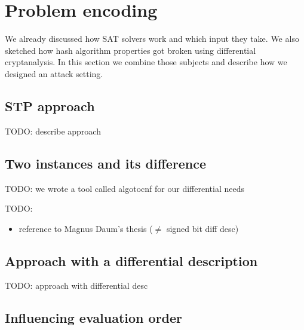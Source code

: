 \renewcommand*\chappic{img/encoding.pdf}
\renewcommand*\chapquote{There is concensus that encoding techniques usually have a dramatic impact on the efficiency of the SAT solver}
\renewcommand*\chapquotesrc{Magnus Bj\"ork}
\chapter{Problem encoding}
\label{ch:enc}

We already discussed how SAT solvers work and which input they take.
We also sketched how hash algorithm properties got broken using
differential cryptanalysis. In this section we combine those
subjects and describe how we designed an attack setting.

\section{STP approach}
\label{sec:enc-stp}


TODO: describe approach

\section{Two instances and its difference}
\label{sec:enc-algotocnf}

TODO: we wrote a tool called algotocnf for our differential needs


TODO:
\begin{itemize}
  \item reference to Magnus Daum's thesis ($\neq$ signed bit diff desc)
\end{itemize}


\section{Approach with a differential description}
\label{sec:enc-diff-desc}

TODO: approach with differential desc

\section{Influencing evaluation order}
\label{sec:enc-order}
